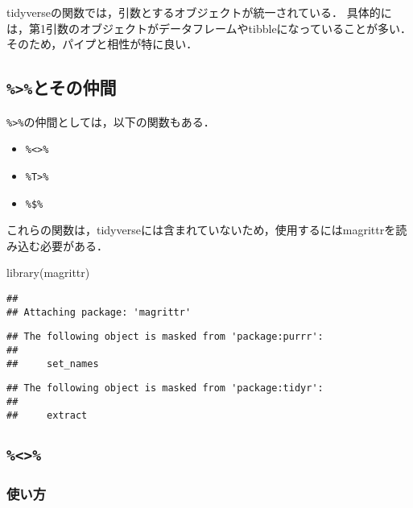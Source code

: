 \documentclass[
]{article}
\newenvironment{Shaded}{\begin{snugshade}}{\end{snugshade}}
\newcommand{\FunctionTok}[1]{\textcolor[rgb]{0.00,0.00,0.00}{#1}}
\newcommand{\NormalTok}[1]{#1}
\providecommand{\tightlist}{%
  \setlength{\itemsep}{0pt}\setlength{\parskip}{0pt}}
\begin{document}
tidyverseの関数では，引数とするオブジェクトが統一されている．
具体的には，第1引数のオブジェクトがデータフレームやtibbleになっていることが多い．
そのため，パイプと相性が特に良い．

\hypertarget{ux3068ux305dux306eux4ef2ux9593}{%
\subsection{\texorpdfstring{\texttt{\%\textgreater{}\%}とその仲間}{\%\textgreater\%とその仲間}}\label{ux3068ux305dux306eux4ef2ux9593}}

\texttt{\%\textgreater{}\%}の仲間としては，以下の関数もある．

\begin{itemize}
\tightlist
\item
  \texttt{\%\textless{}\textgreater{}\%}
\item
  \texttt{\%T\textgreater{}\%}
\item
  \texttt{\%\$\%}
\end{itemize}

これらの関数は，tidyverseには含まれていないため，使用するにはmagrittrを読み込む必要がある．

\begin{Shaded}
\begin{Highlighting}[]
\FunctionTok{library}\NormalTok{(magrittr)}
\end{Highlighting}
\end{Shaded}

\begin{verbatim}
## 
## Attaching package: 'magrittr'
\end{verbatim}

\begin{verbatim}
## The following object is masked from 'package:purrr':
## 
##     set_names
\end{verbatim}

\begin{verbatim}
## The following object is masked from 'package:tidyr':
## 
##     extract
\end{verbatim}

\hypertarget{section}{%
\subsection{\texorpdfstring{\texttt{\%\textless{}\textgreater{}\%}}{\%\textless\textgreater\%}}\label{section}}

\hypertarget{ux4f7fux3044ux65b9}{%
\subsubsection{使い方}\label{ux4f7fux3044ux65b9}}
\end{document}
